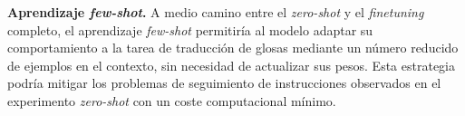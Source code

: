 \textbf{Aprendizaje \textit{few-shot}.}
A medio camino entre el \textit{zero-shot} y el \textit{finetuning} completo, el aprendizaje \textit{few-shot} permitiría al modelo adaptar su comportamiento a la tarea
de traducción de glosas mediante un número reducido de ejemplos en el contexto, sin necesidad de actualizar sus pesos.
Esta estrategia podría mitigar los problemas de seguimiento de instrucciones observados en el experimento \textit{zero-shot} con un coste computacional mínimo.
